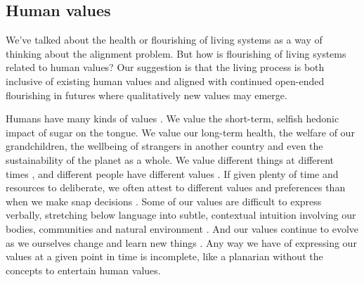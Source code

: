 \documentclass[12pt]{article}
\begin{document}





\subsection{Human values}


We've talked about the health or flourishing of living systems as a way of thinking about the alignment problem. But how is flourishing of living systems related to human values? Our suggestion is that the living process is both inclusive of existing human values and aligned with continued open-ended flourishing in futures where qualitatively new values may emerge. 

Humans have many kinds of values \citep{minsky1986society,tetlock1986value, nagel1979fragmentation, williams1981conflicts, stocker1992plural, haidt2001emotional}. We value the short-term, selfish hedonic impact of sugar on the tongue. We value our long-term health, the welfare of our grandchildren, the wellbeing of strangers in another country and even the sustainability of the planet as a whole. We value different things at different times \citep{ainslie1992picoeconomics, loewenstein1996out, kohlberg1981philosophy, bardi2011dual}, and different people have different values \citep{rawls1993political,sorensen2024roadmap, berlin1969two, leibo2025societal, leibo2026theory}. If given plenty of time and resources to deliberate, we often attest to different values and preferences than when we make snap decisions \citep{yudkowsky2004coherent, rawls1971theory, firth1952ethical, brandt1979theory, smith1994moral, railton1986moral}. Some of our values are difficult to express verbally, stretching below language into subtle, contextual intuition involving our bodies, communities and natural environment \citep{nussbaum2001fragility, scott1998seeing, polanyi1966tacit, dreyfus1972computers, varela1991embodied, wittgenstein1922tractatus}. And our values continue to evolve as we ourselves change and learn new things \citep{singer1981expanding, murdoch2013sovereignty, williams1985ethics, dewey1939theory,gadamer1960wahrheit, nietzsche1883zarathustra,leibo2025societal}. Any way we have of expressing our values at a given point in time is incomplete, like a planarian without the concepts to entertain human values.
\end{document}

